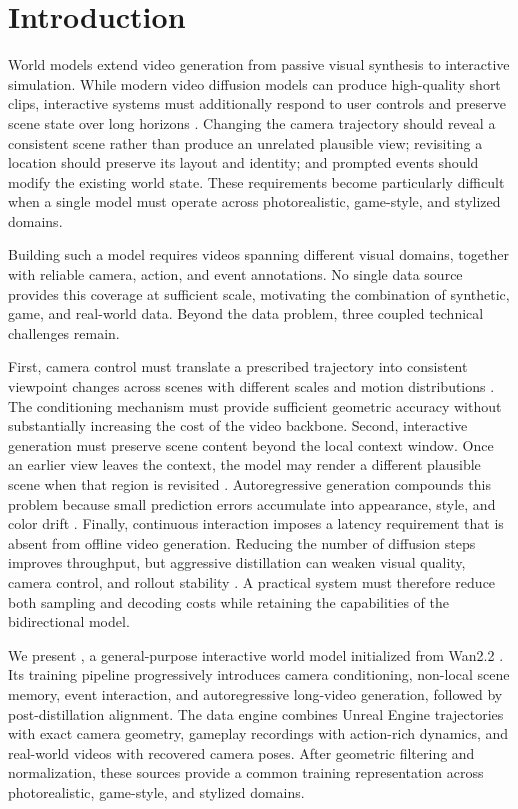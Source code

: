 \section{Introduction}

World models extend video generation from passive visual synthesis to
interactive simulation. While modern video diffusion models can produce
high-quality short clips, interactive systems must additionally respond to
user controls and preserve scene state over long horizons
\citep{wan2025wan, gao2026lingbotworld, hyworld2025}.
Changing the camera trajectory should reveal a consistent scene rather than
produce an unrelated plausible view; revisiting a location should preserve its
layout and identity; and prompted events should modify the existing world
state. These requirements become particularly difficult when a single model
must operate across photorealistic, game-style, and stylized domains.

Building such a model requires videos spanning different visual domains,
together with reliable camera, action, and event annotations. No single data
source provides this coverage at sufficient scale, motivating the combination
of synthetic, game, and real-world data. Beyond the data problem, three coupled
technical challenges remain.

First, camera control must translate a prescribed trajectory into consistent
viewpoint changes across scenes with different scales and motion distributions
\citep{bahmani2025ac3d}. The conditioning mechanism must provide sufficient
geometric accuracy without substantially increasing the cost of the video
backbone.
% 
Second, interactive generation must preserve scene content beyond the local
context window. Once an earlier view leaves the context, the model may render a
different plausible scene when that region is revisited
\citep{hong2025relic}. Autoregressive generation compounds this problem because
small prediction errors accumulate into appearance, style, and color drift
\citep{huang2025selfforcing}.
% 
Finally, continuous interaction imposes a latency requirement that is absent
from offline video generation. Reducing the number of diffusion steps improves
throughput, but aggressive distillation can weaken visual quality, camera
control, and rollout stability \citep{zhu2026causalforcing}. A practical system
must therefore reduce both sampling and decoding costs while retaining the
capabilities of the bidirectional model.

We present \method{}, a general-purpose interactive world model initialized
from Wan2.2 \citep{wan2025wan}. Its training pipeline progressively
introduces camera conditioning, non-local scene memory, event interaction, and
autoregressive long-video generation, followed by post-distillation alignment.
% 
The data engine combines Unreal Engine trajectories with exact camera geometry,
gameplay recordings with action-rich dynamics, and real-world videos with
recovered camera poses. After geometric filtering and normalization, these
sources provide a common training representation across photorealistic,
game-style, and stylized domains.

